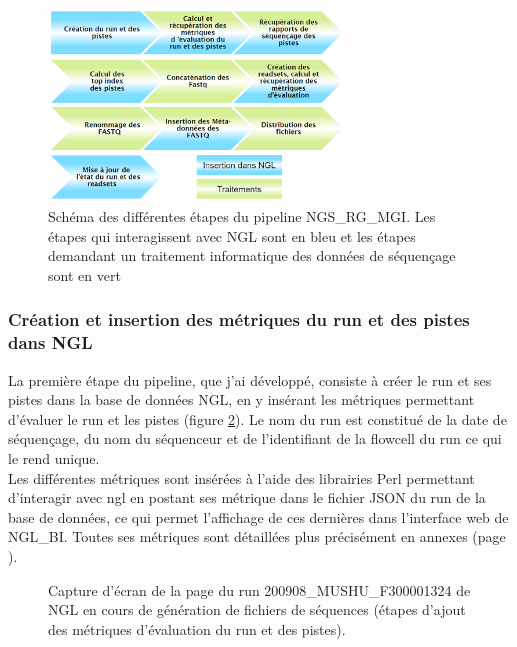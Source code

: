 \begin{figure}[H]
    \centering
    \includegraphics[width=0.7\textwidth]{img/schema-ngsrg-mgi.png}
    \caption{\footnotesize{Schéma des différentes étapes du pipeline NGS\_RG\_MGI. Les étapes qui interagissent avec NGL sont en bleu et les étapes demandant un traitement informatique des données de séquençage sont en vert}}
    \label{schema-ngsrg-mgi}
\end{figure}

\subsubsection*{Création et insertion des métriques du run et des pistes dans NGL }
La première étape du pipeline, que j'ai développé, consiste à créer le run et ses pistes dans la base de données NGL, en y insérant les métriques permettant d'évaluer le run et les pistes (figure \ref{NGL-screenshot_run-lane}).
Le nom du run est constitué de la date de séquençage, du nom du séquenceur et de l'identifiant de la flowcell du run ce qui le rend unique.\\

Les différentes métriques sont insérées à l'aide des librairies Perl permettant d'interagir avec ngl en postant ses métrique dans le fichier JSON du run de la base de données, ce qui permet l'affichage de ces dernières dans l'interface web de NGL\_BI. Toutes ses métriques sont détaillées plus précisément en annexes (page \pageref{anexes1}).\\

\begin{figure}[H]
    \centering
    \caption{\footnotesize{Capture d'écran de la page du run 200908\_MUSHU\_F300001324 de NGL en cours de génération de fichiers de séquences (étapes d'ajout des métriques d'évaluation du run et des pistes).}}
    \label{NGL-screenshot_run-lane}
\end{figure}

